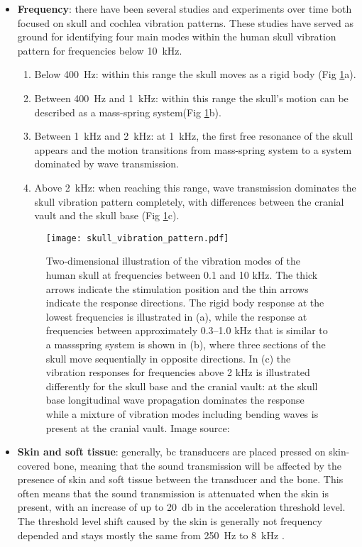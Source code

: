 \begin{itemize}
\item \textbf{Frequency}: there have been several studies and experiments over time both focused on skull and cochlea vibration patterns. These studies have served as ground for identifying four main modes within the human skull vibration pattern for frequencies below \SI{10}{\kilo\hertz}.
\begin{enumerate}
\item Below \SI{400}{\hertz}: within this range the skull moves as a rigid body (Fig \ref{fig:skull_vibration_pattern}a).\citep{stenfelt_2005b}
\item Between \SI{400}{\hertz} and \SI{1}{\kilo\hertz}: within this range the skull's motion can be described as a mass-spring system(Fig \ref{fig:skull_vibration_pattern}b).
\item Between \SI{1}{\kilo\hertz} and \SI{2}{\kilo\hertz}: at \SI{1}{\kilo\hertz}, the first free resonance of the skull appears \citep{hakansson_1994} and the motion transitions from mass-spring system to a system dominated by wave transmission.
\item Above \SI{2}{\kilo\hertz}: when reaching this range, wave transmission dominates the skull vibration pattern completely, with differences between the cranial vault and the skull base (Fig \ref{fig:skull_vibration_pattern}c).
\end{enumerate}
\begin{figure}[H]
	\centering
		\texttt{[image: skull\_vibration\_pattern.pdf]}
		\caption{Two-dimensional illustration of the vibration modes of the human skull at frequencies between 0.1 and 10 kHz. The thick arrows indicate the stimulation position and the thin arrows indicate the response directions. The rigid body response at the lowest frequencies is illustrated in (a), while the response at frequencies between approximately 0.3–1.0 kHz that is similar to a massspring system is shown in (b), where three sections of the skull move sequentially in opposite directions. In (c) the vibration responses for frequencies above 2 kHz is illustrated differently for the skull base and the cranial vault: at the skull base longitudinal wave propagation dominates the response while a mixture of vibration modes including bending waves is present at the cranial vault. Image source: \citep{puria_2013}}
		\label{fig:skull_vibration_pattern}
\end{figure}
\item \textbf{Skin and soft tissue}: generally, \gls{bc} transducers are placed pressed on skin-covered bone, meaning that the sound transmission will be affected by the presence of skin and soft tissue between the transducer and the bone. This often means that the sound transmission is attenuated when the skin is present, with an increase of up to \SI{20}{\decibel} in the acceleration threshold level. The threshold level shift caused by the skin is generally not frequency depended and stays mostly the same from \SI{250}{\hertz} to \SI{8}{\kilo\hertz} \citep{hakansson_1985}.

\end{itemize}
